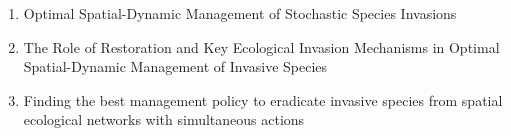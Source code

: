 \documentclass{article}
\theoremstyle{remark}
\theoremstyle{remark}
\theoremstyle{remark}
\theoremstyle{remark}
\theoremstyle{remark}
\theoremstyle{remark}
\begin{document}
\begin{enumerate}
\begin{itemize}
	\end{itemize}
 
 \item Optimal Spatial-Dynamic Management of Stochastic Species Invasions \cite{Hall2018}
 
 \item The Role of Restoration and Key Ecological Invasion Mechanisms in Optimal Spatial-Dynamic Management of Invasive Species \cite{ALBERS201844}
 
 \item Finding the best management policy to eradicate invasive species from spatial ecological networks with simultaneous actions \cite{doi:10.1111}
 
 
\end{enumerate}





\end{document}
